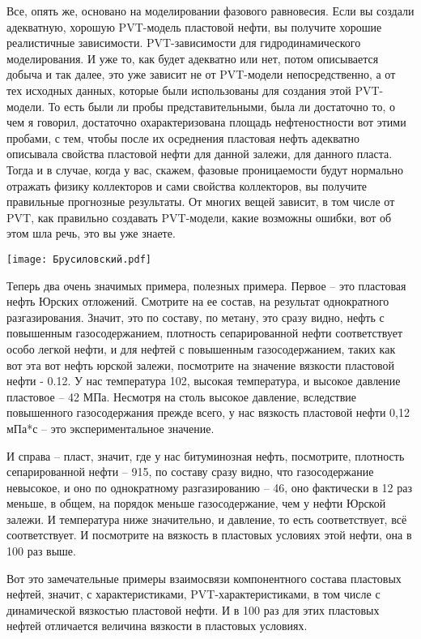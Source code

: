 \documentclass[main.tex]{subfiles}
\begin{document}
Все, опять же, основано на моделировании фазового равновесия.
Если вы создали адекватную, хорошую PVT-модель пластовой нефти, вы получите хорошие реалистичные зависимости.
PVT-зависимости для гидродинамического моделирования.
И уже то, как будет адекватно или нет, потом описывается добыча и так далее, это уже зависит не от PVT-модели непосредственно, а от тех исходных данных, которые были использованы для создания этой PVT-модели.
То есть были ли пробы представительными, была ли достаточно то, о чем я говорил,
достаточно охарактеризована площадь нефтеностности вот этими пробами, с тем, чтобы после их осреднения пластовая нефть адекватно описывала свойства пластовой нефти для данной залежи, для данного пласта.
Тогда и в случае, когда у вас, скажем, фазовые проницаемости будут нормально отражать физику коллекторов и сами свойства коллекторов, вы получите правильные прогнозные результаты.
От многих вещей зависит, в том числе от PVT, как правильно создавать PVT-модели,
какие возможны ошибки, вот об этом шла речь, это вы уже знаете.

\begin{center}
\texttt{[image: Брусиловский.pdf]}
\end{center}

Теперь два очень значимых примера, полезных примера.
Первое -- это пластовая нефть Юрских отложений.
Смотрите на ее состав, на результат однократного разгазирования.
Значит, это по составу, по метану, это сразу видно, нефть с повышенным газосодержанием, плотность сепарированной нефти соответствует особо легкой нефти, и для нефтей с повышенным газосодержанием, таких как вот эта вот нефть юрской залежи, посмотрите на значение вязкости пластовой нефти - 0.12.
У нас температура 102, высокая температура, и высокое давление пластовое -- 42 МПа.
Несмотря на столь высокое давление, вследствие повышенного газосодержания прежде всего, у нас вязкость пластовой нефти 0,12 мПа*с -- это экспериментальное значение.

И справа -- пласт, значит, где у нас битуминозная нефть, посмотрите, плотность сепарированной нефти -- 915, по составу сразу видно, что газосодержание невысокое, и оно по однократному разгазированию -- 46, оно фактически в 12 раз меньше, в общем, на порядок меньше газосодержание, чем у нефти Юрской залежи.
И температура ниже значительно, и давление, то есть соответствует, всё соответствует.
И посмотрите на вязкость в пластовых условиях этой нефти, она в 100 раз выше.

Вот это замечательные примеры взаимосвязи компонентного состава пластовых нефтей, значит, с характеристиками, PVT-характеристиками, в том числе с динамической вязкостью пластовой нефти.
И в 100 раз для этих пластовых нефтей отличается величина вязкости в пластовых условиях.
\end{document}
